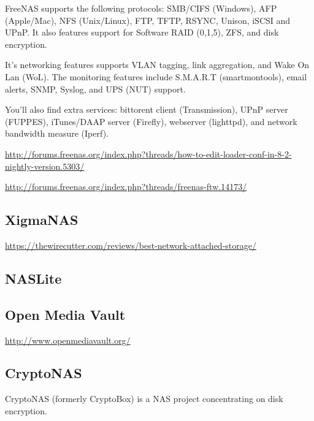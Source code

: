 FreeNAS supports the following protocols: SMB/CIFS (Windows), AFP (Apple/Mac),
NFS (Unix/Linux), FTP, TFTP, RSYNC, Unison, iSCSI and UPnP. It also features
support for Software RAID (0,1,5), ZFS, and disk encryption.

It's networking features supports VLAN tagging, link aggregation, and Wake On
Lan (WoL). The monitoring features include S.M.A.R.T (smartmontools), email alerts, SNMP, Syslog, and UPS (NUT) support.

You'll also find extra services: bittorent client (Transmission), UPnP server
(FUPPES), iTunes/DAAP server (Firefly), webserver (lighttpd), and network
bandwidth measure (Iperf).

\url{http://forums.freenas.org/index.php?threads/how-to-edit-loader-conf-in-8-2-nightly-version.5303/}

\url{http://forums.freenas.org/index.php?threads/freenas-ftw.14173/}

\subsection{XigmaNAS}
\label{sec:XigmaNAS}

\url{https://thewirecutter.com/reviews/best-network-attached-storage/}


\subsection{NASLite}
\label{sec:NASLite}

\subsection{Open Media Vault}
\label{sec:OpenMediaVault_O/S-for-NAS}

\url{http://www.openmediavault.org/}

\subsection{CryptoNAS}

CryptoNAS (formerly CryptoBox) is a NAS project concentrating on disk
encryption.

